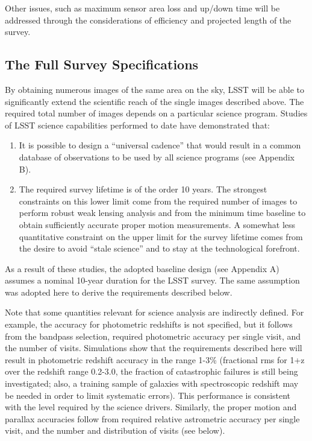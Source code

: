Other issues, such as maximum sensor area loss and up/down time will be
addressed through the considerations of efficiency and projected length of
the survey.



\subsection{          The Full Survey Specifications                   }


By obtaining numerous images of the same area on the sky, LSST will be able
to significantly extend the scientific reach of the single images described
above.  The required total number of images depends on a particular science
program.  Studies of LSST science capabilities performed to date have
demonstrated that:
\begin{enumerate}
\item It is possible to design a ``universal cadence'' that would result in
a common database of observations to be used by all science programs (see
Appendix B).
\item The required survey lifetime is of the order 10 years. The strongest
constraints on this lower limit come from the required number of images to
perform robust weak lensing analysis and from the minimum time baseline to
obtain sufficiently accurate proper motion measurements. A somewhat less
quantitative constraint on the upper limit for the survey lifetime comes
from the desire to avoid ``stale science'' and to stay at the
technological forefront.
\end{enumerate}

As a result of these studies, the adopted baseline design (see Appendix A)
assumes a nominal 10-year duration for the LSST survey. The same assumption
was adopted here to derive the requirements described below.

Note that some quantities relevant for science analysis are indirectly
defined. For example, the accuracy for photometric redshifts is not
specified, but it follows from the bandpass selection, required photometric
accuracy per single visit, and the number of visits. Simulations show that
the requirements described here will result in photometric redshift
accuracy in the range 1-3\% (fractional rms for 1+z over the redshift range
0.2-3.0, the fraction of catastrophic failures is still being investigated;
also, a training sample of galaxies with spectroscopic redshift may be
needed in order to limit systematic errors). This performance is consistent
with the level required by the science drivers. Similarly, the proper
motion and parallax accuracies follow from required relative astrometric
accuracy per single visit, and the number and distribution of visits (see
below).



